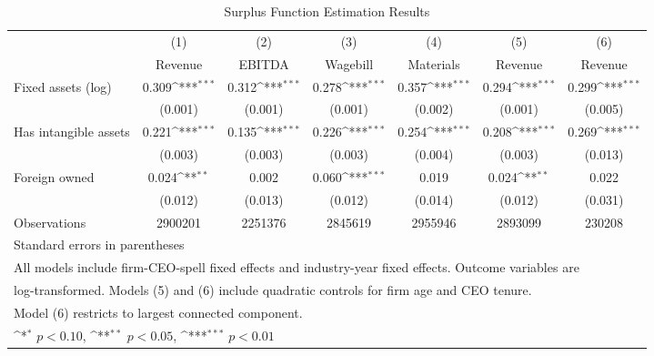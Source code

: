 \begin{table}[htbp]\centering
\def\sym#1{\ifmmode^{#1}\else\(^{#1}\)\fi}
\caption{Surplus Function Estimation Results}
\begin{tabular}{l*{6}{c}}
\toprule
                    &\multicolumn{1}{c}{(1)}&\multicolumn{1}{c}{(2)}&\multicolumn{1}{c}{(3)}&\multicolumn{1}{c}{(4)}&\multicolumn{1}{c}{(5)}&\multicolumn{1}{c}{(6)}\\
                    &\multicolumn{1}{c}{Revenue}&\multicolumn{1}{c}{EBITDA}&\multicolumn{1}{c}{Wagebill}&\multicolumn{1}{c}{Materials}&\multicolumn{1}{c}{Revenue}&\multicolumn{1}{c}{Revenue}\\
\midrule
Fixed assets (log)  &       0.309\sym{***}&       0.312\sym{***}&       0.278\sym{***}&       0.357\sym{***}&       0.294\sym{***}&       0.299\sym{***}\\
                    &     (0.001)         &     (0.001)         &     (0.001)         &     (0.002)         &     (0.001)         &     (0.005)         \\
\addlinespace
Has intangible assets&       0.221\sym{***}&       0.135\sym{***}&       0.226\sym{***}&       0.254\sym{***}&       0.208\sym{***}&       0.269\sym{***}\\
                    &     (0.003)         &     (0.003)         &     (0.003)         &     (0.004)         &     (0.003)         &     (0.013)         \\
\addlinespace
Foreign owned       &       0.024\sym{**} &       0.002         &       0.060\sym{***}&       0.019         &       0.024\sym{**} &       0.022         \\
                    &     (0.012)         &     (0.013)         &     (0.012)         &     (0.014)         &     (0.012)         &     (0.031)         \\
\midrule
Observations        &     2900201         &     2251376         &     2845619         &     2955946         &     2893099         &      230208         \\
\bottomrule
\multicolumn{7}{l}{\footnotesize Standard errors in parentheses}\\
\multicolumn{7}{l}{\footnotesize All models include firm-CEO-spell fixed effects and industry-year fixed effects. Outcome variables are}\\
\multicolumn{7}{l}{\footnotesize log-transformed. Models (5) and (6) include quadratic controls for firm age and CEO tenure.}\\
\multicolumn{7}{l}{\footnotesize Model (6) restricts to largest connected component.}\\
\multicolumn{7}{l}{\footnotesize \sym{*} \(p<0.10\), \sym{**} \(p<0.05\), \sym{***} \(p<0.01\)}\\
\end{tabular}
\end{table}

